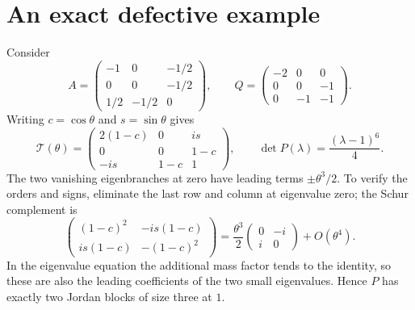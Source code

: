 \documentclass[11pt]{article}
\begin{document}
\section{An exact defective example}
Consider
\begin{equation}\label{eq:exampleAQ}
A=\begin{pmatrix}-1&0&-1/2\\0&0&-1/2\\1/2&-1/2&0\end{pmatrix},
\qquad
Q=\begin{pmatrix}-2&0&0\\0&0&-1\\0&-1&-1\end{pmatrix}.
\end{equation}
Writing $c=\cos\theta$ and $s=\sin\theta$ gives
\[
\mathcal T(\theta)=
\begin{pmatrix}2(1-c)&0&i s\\0&0&1-c\\-i s&1-c&1\end{pmatrix},
\qquad
\det P(\lambda)=\frac{(\lambda-1)^6}{4}.
\]
The two vanishing eigenbranches at zero have leading terms $\pm\theta^3/2$.
To verify the orders and signs, eliminate the last row and column at eigenvalue zero;
the Schur complement is
\[
\begin{pmatrix}(1-c)^2&-i s(1-c)\\i s(1-c)&-(1-c)^2\end{pmatrix}
=\frac{\theta^3}{2}\begin{pmatrix}0&-i\\i&0\end{pmatrix}+O(\theta^4).
\]
In the eigenvalue equation the additional mass factor tends to the identity, so these
are also the leading coefficients of the two small eigenvalues. Hence $P$ has exactly
two Jordan blocks of size three at $1$.
\end{document}
